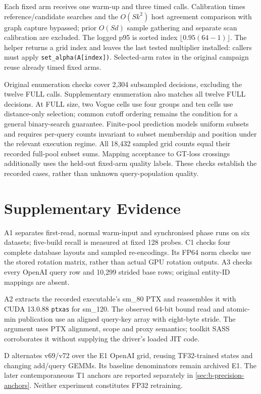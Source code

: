 Each fixed arm receives one warm-up and three timed calls. Calibration
times reference/candidate searches and the $O(Sk^2)$ host agreement
comparison with graph capture bypassed; prior $O(Sd)$ sample gathering
and separate scan calibration are excluded. The logged p95 is sorted
index $\lfloor0.95(64-1)\rfloor$. The helper returns a grid index and
leaves the last tested multiplier installed: callers must apply
\texttt{set\_alpha(A[index])}. Selected-arm rates in the original campaign
reuse already timed fixed arms.

Original enumeration checks cover 2,304 subsampled decisions, excluding
the twelve FULL calls. Supplementary enumeration also matches all twelve
FULL decisions. At FULL size, two Vogue cells use four groups and ten
cells use distance-only selection; common cutoff ordering remains the
condition for a general binary-search guarantee. Finite-pool prediction
models uniform subsets and requires per-query counts invariant to subset
membership and position under the relevant execution regime. All 18,432
sampled grid counts equal their recorded full-pool subset sums. Mapping
acceptance to GT-loss crossings additionally uses the held-out fixed-arm
quality labels. These checks establish the recorded cases, rather than
unknown query-population quality.

\section{Supplementary Evidence}
\label{sec:a-supplement}

A1 separates first-read, normal
warm-input and synchronised phase runs on six datasets; five-build recall
is measured at fixed 128 probes. C1 checks four complete database layouts
and sampled re-encodings. Its FP64 norm checks use the stored rotation
matrix, rather than actual GPU rotation outputs. A3 checks every OpenAI
query row and 10,299 strided base rows; original entity-ID mappings are
absent.

A2 extracts the recorded executable's sm\_80 PTX and reassembles it with
CUDA 13.0.88 \texttt{ptxas} for sm\_120. The observed 64-bit bound read
and atomic-min publication use an aligned query-key array with eight-byte
stride. The argument uses PTX alignment, scope and proxy semantics;
toolkit SASS corroborates it without supplying the driver's loaded JIT
code.

D alternates v69/v72 over the E1 OpenAI grid, reusing TF32-trained states
and changing add/query GEMMs. Its baseline denominators remain archived
E1. The later contemporaneous T1 anchors are reported separately in
\cref{sec:b-precision-anchors}. Neither experiment constitutes FP32
retraining.

